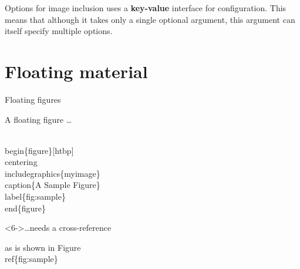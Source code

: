 \begin{frame}[fragile]{Options for image inclusion}
   uses a \textbf{\alert<3,5-6>{key}\alert<5-6>{-}\alert<4,5-6>{value}} interface for configuration.
  This means that although it takes only a single optional argument, this argument can itself specify multiple options.



\end{frame}



\section{Floating material}

\begin{frame}[fragile]{Floating figures}

  \begin{block}{A floating figure \dots}
	\begin{semiverbatim}
	  \\begin\{figure\}\alert<2>{[htbp]}
	  \alert<3>{\\centering}
	  \\includegraphics\{myimage\}
	  \alert<4>{\\caption\{A Sample Figure\}}
	  \alert<5>{\\label\{fig:sample\}}
	  \\end\{figure\}
	\end{semiverbatim}
  \end{block}

  \begin{block}<6->{\ldots needs a cross-reference}
	\begin{semiverbatim}
	  as is shown in Figure~\alert<6>{\\ref\{fig:sample\}}
	\end{semiverbatim}
  \end{block}

\end{frame}


